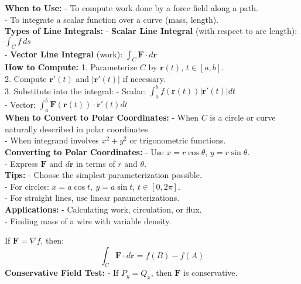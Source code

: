 \documentclass[9pt]{article}
\begin{document}
\begin{multicols}{2}
\begin{tcolorbox}[title=\textbf{Line Integrals}, colframe=lightyellow]
\textbf{When to Use:}
- To compute work done by a force field along a path. \\
- To integrate a scalar function over a curve (mass, length). \\
\textbf{Types of Line Integrals:}
- \textbf{Scalar Line Integral} (with respect to arc length): \( \int_C f \, ds \) \\
- \textbf{Vector Line Integral} (work): \( \int_C \mathbf{F} \cdot d\mathbf{r} \) \\
\textbf{How to Compute:}
1. Parameterize \( C \) by \( \mathbf{r}(t) \), \( t \in [a, b] \). \\
2. Compute \( \mathbf{r}'(t) \) and \( |\mathbf{r}'(t)| \) if necessary. \\
3. Substitute into the integral:
   - Scalar: \( \int_a^b f(\mathbf{r}(t)) |\mathbf{r}'(t)| dt \) \\
   - Vector: \( \int_a^b \mathbf{F}(\mathbf{r}(t)) \cdot \mathbf{r}'(t) dt \) \\
\textbf{When to Convert to Polar Coordinates:}
- When \( C \) is a circle or curve naturally described in polar coordinates. \\
- When integrand involves \( x^2 + y^2 \) or trigonometric functions. \\
\textbf{Converting to Polar Coordinates:}
- Use \( x = r \cos \theta \), \( y = r \sin \theta \). \\
- Express \( \mathbf{F} \) and \( d\mathbf{r} \) in terms of \( r \) and \( \theta \). \\
\textbf{Tips:}
- Choose the simplest parameterization possible. \\
- For circles: \( x = a \cos t,\ y = a \sin t \), \( t \in [0, 2\pi] \). \\
- For straight lines, use linear parameterizations. \\
\textbf{Applications:}
- Calculating work, circulation, or flux. \\
- Finding mass of a wire with variable density.
\end{tcolorbox}

\begin{tcolorbox}[title=\textbf{Fundamental Theorem for Line Integrals}, colframe=lightblue]
If \( \mathbf{F} = \nabla f \), then:
\[ \int_C \mathbf{F} \cdot d\mathbf{r} = f(B) - f(A) \]
\textbf{Conservative Field Test:}
- If \( P_y = Q_x \), then \( \mathbf{F} \) is conservative.
\end{tcolorbox}


\end{multicols}
\end{document}
